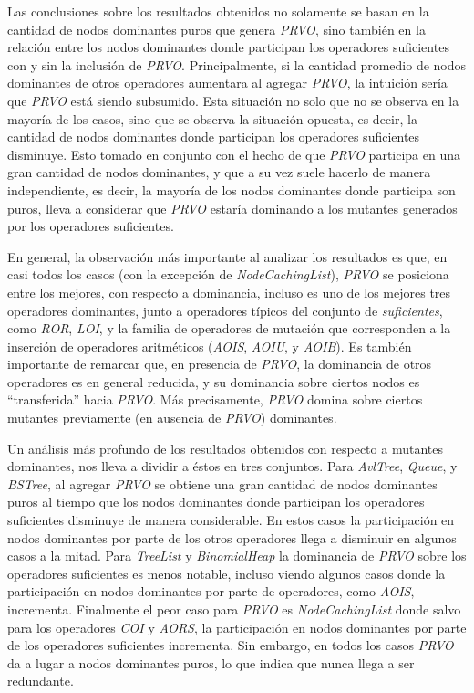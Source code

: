 Las conclusiones sobre los resultados obtenidos no solamente se basan en la cantidad de nodos dominantes puros que genera \emph{PRVO}, sino tambi\'en en la relaci\'on entre los nodos dominantes donde participan los operadores suficientes con y sin la inclusi\'on de \emph{PRVO}. Principalmente, si la cantidad promedio de nodos dominantes de otros operadores aumentara al agregar \emph{PRVO}, la intuici\'on ser\'ia que \emph{PRVO} est\'a siendo subsumido. Esta situaci\'on no solo que no se observa en la mayor\'ia de los casos, sino que se observa la situaci\'on opuesta, es decir, la cantidad de nodos dominantes donde participan los operadores suficientes disminuye. Esto tomado en conjunto con el hecho de que \emph{PRVO} participa en una gran cantidad de nodos dominantes, y que a su vez suele hacerlo de manera independiente, es decir, la mayor\'ia de los nodos dominantes donde participa son puros, lleva a considerar que \emph{PRVO} estar\'ia dominando a los mutantes generados por los operadores suficientes.

En general, la observaci\'on m\'as importante al analizar los resultados es que, en casi todos los casos (con la excepci\'on de \emph{NodeCachingList}), \emph{PRVO} se posiciona entre los mejores, con respecto a dominancia, incluso es uno de los mejores tres operadores dominantes, junto a operadores t\'ipicos del conjunto de \emph{suficientes}, como \emph{ROR}, \emph{LOI}, y la familia de operadores de mutaci\'on que corresponden a la inserci\'on de operadores aritm\'eticos (\emph{AOIS}, \emph{AOIU}, y \emph{AOIB}). Es tambi\'en importante de remarcar que, en presencia de \emph{PRVO}, la dominancia de otros operadores es en general reducida, y su dominancia sobre ciertos nodos es ``transferida'' hacia \emph{PRVO}. M\'as precisamente, \emph{PRVO} domina sobre ciertos mutantes previamente (en ausencia de \emph{PRVO}) dominantes.

Un an\'alisis m\'as profundo de los resultados obtenidos con respecto a mutantes dominantes, nos lleva a dividir a \'estos en tres conjuntos. Para \emph{AvlTree}, \emph{Queue}, y \emph{BSTree}, al agregar \emph{PRVO} se obtiene una gran cantidad de nodos dominantes puros al tiempo que los nodos dominantes donde participan los operadores suficientes disminuye de manera considerable. En estos casos la participaci\'on en nodos dominantes por parte de los otros operadores llega a disminuir en algunos casos a la mitad. Para \emph{TreeList} y \emph{BinomialHeap} la dominancia de \emph{PRVO} sobre los operadores suficientes es menos notable, incluso viendo algunos casos donde la participaci\'on en nodos dominantes por parte de operadores, como \emph{AOIS}, incrementa. Finalmente el peor caso para \emph{PRVO} es \emph{NodeCachingList} donde salvo para los operadores \emph{COI} y \emph{AORS}, la participaci\'on en nodos dominantes por parte de los operadores suficientes incrementa. Sin embargo, en todos los casos \emph{PRVO} da a lugar a nodos dominantes puros, lo que indica que nunca llega a ser redundante.

